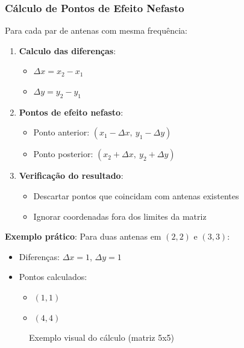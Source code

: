 \documentclass[a4paper,12pt]{article}
\begin{document}
\subsubsection{Cálculo de Pontos de Efeito Nefasto}

Para cada par de antenas com mesma frequência:

\begin{enumerate}
    \item \textbf{Calculo das diferenças}:
    \begin{itemize}
        \item $\Delta x = x_2 - x_1$
        \item $\Delta y = y_2 - y_1$
    \end{itemize}
    
    \item \textbf{Pontos de efeito nefasto}:
    \begin{itemize}
        \item Ponto anterior: $(x_1 - \Delta x,\ y_1 - \Delta y)$
        \item Ponto posterior: $(x_2 + \Delta x,\ y_2 + \Delta y)$
    \end{itemize}
    
    \item \textbf{Verificação do resultado}:
    \begin{itemize}
        \item Descartar pontos que coincidam com antenas existentes
        \item Ignorar coordenadas fora dos limites da matriz
    \end{itemize}
\end{enumerate}
\newpage
\textbf{Exemplo prático}:
Para duas antenas em $(2,2)$ e $(3,3)$:
\begin{itemize}
    \item Diferenças: $\Delta x = 1$, $\Delta y = 1$
    \item Pontos calculados:
    \begin{itemize}
        \item $(1,1)$
        \item $(4,4)$
    \end{itemize}
\end{itemize}

\begin{figure}[H]
\centering
{}
\caption{Exemplo visual do cálculo (matriz 5x5)}
\end{figure}
\newpage
\end{document}
